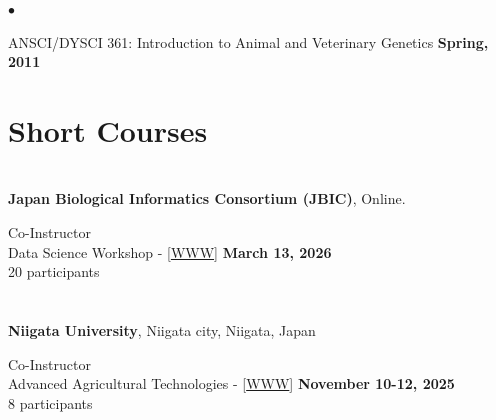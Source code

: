 \documentclass[margin,line,10pt]{res}
\newenvironment{list2}{
  \begin{list}{$\bullet$}{%
      \setlength{\itemsep}{0in}
      \setlength{\parsep}{0in} \setlength{\parskip}{0in}
      \setlength{\topsep}{0in} \setlength{\partopsep}{0in} 
      \setlength{\leftmargin}{0.2in}}}{\end{list}}
\begin{document}
\begin{resume}
\begin{list2}
\vspace{0.5cm}

\item ANSCI/DYSCI 361: Introduction to Animal and Veterinary Genetics    \hfill {\bf Spring, 2011} 

  \end{list2}



\vspace{0.5cm}
\section{\sc Short Courses}
\vspace{1cm}


\section{}


{\bf Japan Biological Informatics Consortium (JBIC)}, Online.  %
\vspace{.01pt}

Co-Instructor  \\
Data Science Workshop - [\textcolor{blue}{\href{https://www.jbic.or.jp/jbic/wp-content/uploads/2026/02/260312-13data_science.pdf}{WWW}}] 
 \hfill {\bf March 13, 2026}  \\
20 participants






\section{}


{\bf Niigata University}, Niigata city, Niigata, Japan
\vspace{.01pt}

Co-Instructor  \\
Advanced Agricultural Technologies - [\textcolor{blue}{\href{https://sites.google.com/ut-biomet.org/aatniigatau/}{WWW}}] %
\hfill {\bf November 10-12, 2025} \\
8 participants 





\section{}



\end{resume}
\end{document}
